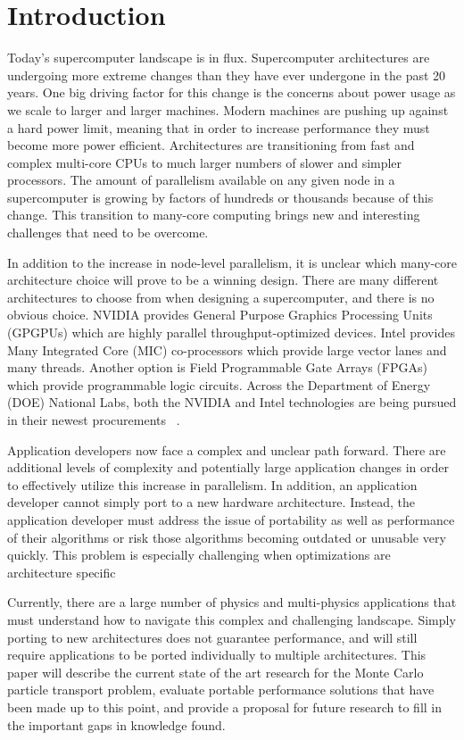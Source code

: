 \section{ \textbf{Introduction}}

Today's supercomputer landscape is in flux.
%
Supercomputer architectures are undergoing more extreme changes than they have ever undergone in the past 20 years.
%
One big driving factor for this change is the concerns about power usage as we scale to larger and larger machines.
%
Modern machines are pushing up against a hard power limit, meaning that in order to increase performance they must become more power efficient.
%
Architectures are transitioning from fast and complex multi-core CPUs to much larger numbers of slower and simpler processors.
%
The amount of parallelism available on any given node in a supercomputer is growing by factors of hundreds or thousands because of this change.
%
This transition to many-core computing brings new and interesting challenges that need to be overcome.
%

%
In addition to the increase in node-level parallelism, it is unclear which many-core architecture choice will prove to be a winning design.
%
There are many different architectures to choose from when designing a supercomputer, and there is no obvious choice.
%
NVIDIA provides General Purpose Graphics Processing Units (GPGPUs) which are highly parallel throughput-optimized devices.
%
Intel provides Many Integrated Core (MIC) co-processors which provide large vector lanes and many threads.
%
Another option is Field Programmable Gate Arrays (FPGAs) which provide programmable logic circuits.
%
Across the Department of Energy (DOE) National Labs, both the NVIDIA and Intel technologies are being pursued in their newest procurements ~\cite{coralWeb, trinityWeb}.
%

Application developers now face a complex and unclear path forward.
%
There are additional levels of complexity and potentially large application changes in order to effectively utilize this increase in parallelism.
%
In addition, an application developer cannot simply port to a new hardware architecture.
%
Instead, the application developer must address the issue of portability as well as performance of their algorithms or risk those algorithms becoming outdated or unusable very quickly.
%
This problem is especially challenging when optimizations are architecture specific
%

%
Currently, there are a large number of physics and multi-physics applications that must understand how to navigate this complex and challenging landscape.
%
Simply porting to new architectures does not guarantee performance, and will still require applications to be ported individually to multiple architectures.
%
This paper will describe the current state of the art research for the Monte Carlo particle transport problem, evaluate portable performance solutions that have been made up to this point, and provide a proposal for future research to fill in the important gaps in knowledge found.
%

